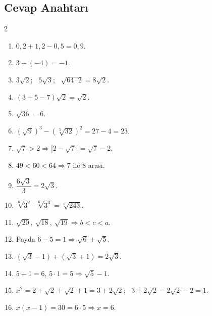 \subsection*{Cevap Anahtarı}
{\small
\begin{multicols}{2}
\begin{enumerate}[label=\textbf{\arabic*.},leftmargin=*,itemsep=1pt]
\item \(0{,}2+1{,}2-0{,}5=0{,}9\).
\item \(3+(-4)=-1\).
\item \(3\sqrt2\); \ \(5\sqrt3\); \ \(\sqrt{64\cdot 2}=8\sqrt2\).
\item \((3+5-7)\sqrt2=\sqrt2\).
\item \(\sqrt{36}=6\).
\item \((\sqrt9)^3-(\sqrt[5]{32})^2=27-4=23\).
\item \(\sqrt7>2\Rightarrow|2-\sqrt7|=\sqrt7-2\).
\item \(49<60<64\Rightarrow 7\) ile \(8\) arası.
\item \(\dfrac{6\sqrt3}{3}=2\sqrt3\).
\item \(\sqrt[6]{3^2}\cdot\sqrt[6]{3^3}=\sqrt[6]{243}\).
\item \(\sqrt{20},\ \sqrt{18},\ \sqrt{19}\Rightarrow b<c<a\).
\item Payda \(6-5=1\Rightarrow\sqrt6+\sqrt5\).
\item \((\sqrt3-1)+(\sqrt3+1)=2\sqrt3\).
\item \(5+1=6\), \(5\cdot 1=5\Rightarrow\sqrt5-1\).
\item \(x^2=2+\sqrt2+\sqrt2+1=3+2\sqrt2\); \ \(3+2\sqrt2-2\sqrt2-2=1\).
\item \(x(x-1)=30=6\cdot 5\Rightarrow x=6\).
\end{enumerate}
\end{multicols}}
